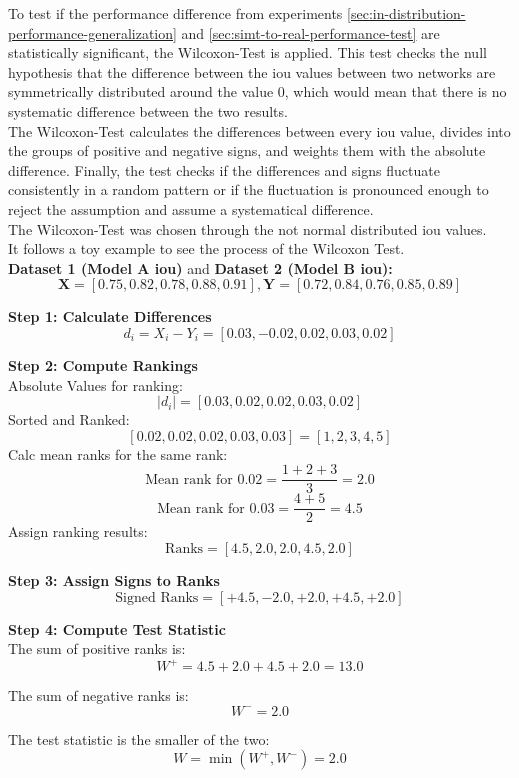 	\clearpage
	To test if the performance difference from experiments \ref{sec:in-distribution-performance-generalization} and \ref{sec:simt-to-real-performance-test} are statistically significant, the Wilcoxon-Test \cite{Rey2011} is applied. This test checks the null hypothesis that the difference between the \ac{iou} values between two networks are symmetrically distributed around the value 0, which would mean that there is no systematic difference between the two results.\\
	The Wilcoxon-Test calculates the differences between every \ac{iou} value, divides into the groups of positive and negative signs, and weights them with the absolute difference. Finally, the test checks if the differences and signs fluctuate consistently in a random pattern or if the fluctuation is pronounced enough to reject the assumption and assume a systematical difference.\\
	The Wilcoxon-Test was chosen through the not normal distributed \ac{iou} values.
	\\
	It follows a toy example to see the process of the Wilcoxon Test.\\
	\textbf{Dataset 1 (Model A \ac{iou})} and \textbf{Dataset 2 (Model B \ac{iou}):}
	\[
	\mathbf{X} = [0.75, 0.82, 0.78, 0.88, 0.91], \mathbf{Y} = [0.72, 0.84, 0.76, 0.85, 0.89]
	\]
	
	\textbf{Step 1: Calculate Differences}
	\[
	d_i = X_i - Y_i = [0.03, -0.02, 0.02, 0.03, 0.02]
	\]
	
	\textbf{Step 2: Compute Rankings}\\
	Absolute Values for ranking:
	\[
	|d_i| = [0.03, 0.02, 0.02, 0.03, 0.02]
	\]
	Sorted and Ranked:
	\[
	[0.02, 0.02, 0.02, 0.03, 0.03] = [1, 2, 3, 4, 5]
	\]
	Calc mean ranks for the same rank:
	\[
	\text{Mean rank for } 0.02 = \frac{1 + 2 + 3}{3} = 2.0
	\]
	\[
	\text{Mean rank for } 0.03 = \frac{4 + 5}{2} = 4.5
	\]
	Assign ranking results:
	\[
	\text{Ranks} = [4.5, 2.0, 2.0, 4.5, 2.0]
	\]
	
	\textbf{Step 3: Assign Signs to Ranks}
	\[
	\text{Signed Ranks} = [+4.5, -2.0, +2.0, +4.5, +2.0]
	\]
	
	\textbf{Step 4: Compute Test Statistic}\\
	The sum of positive ranks is:
	\[
	W^+ = 4.5 + 2.0 + 4.5 + 2.0 = 13.0
	\]
	
	The sum of negative ranks is:
	\[
	W^- = 2.0
	\]
	
	The test statistic is the smaller of the two:
	\[
	W = \min(W^+, W^-) = 2.0
	\]
	
